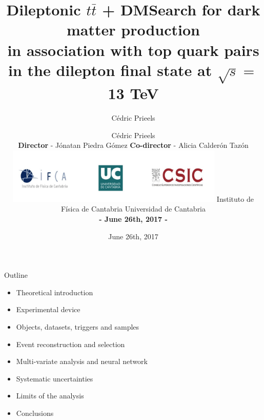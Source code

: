 \documentclass[8 pt]{beamer}
\title{Dileptonic $t \bar t$ + DM}
\date{June 26th, 2017}
\author{C\'{e}dric Prieels}
\begin{document}
\begin{frame}
\vspace{-15pt} 
\title{Search for dark matter production \\ in association with top quark pairs \\ in the dilepton final state at $\sqrt{s} = $ 13 TeV}
\author{C\'{e}dric Prieels \\ \vspace{10pt} \textbf{Director} - J\'{o}natan Piedra G\'{o}mez \newline \textbf{Co-director} - Alicia Calder\'{o}n Taz\'{o}n \\ \vspace{5pt} \includegraphics[width= 0.78\textwidth]{figs/logos.jpg} \newline \vspace{5pt} Instituto de F\'{i}sica de Cantabria \newline Universidad de Cantabria \newline \vspace{5pt} \begin{center} \textbf{- June 26th, 2017 -} \end{center}}

\date{}
\vspace{15pt}
\maketitle

\centering
  
\end{frame}


\begin{frame}{Outline}

	\begin{itemize}
		\item Theoretical introduction \vfill
		\item Experimental device \vfill
		\item Objects, datasets, triggers and samples \vfill
		\item Event reconstruction and selection \vfill
		\item Multi-variate analysis and neural network \vfill
		\item Systematic uncertainties \vfill
		\item Limits of the analysis \vfill
		\item Conclusions \vfill
	\end{itemize}

\end{frame}
\end{document}

